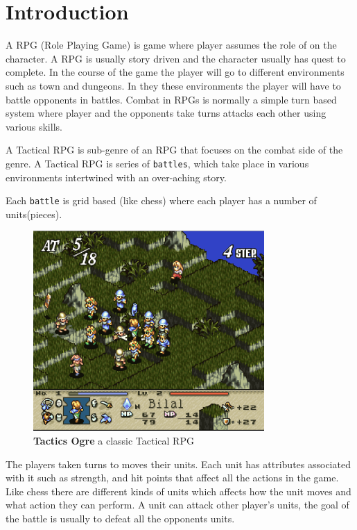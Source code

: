 %
%
%
 \maketitle


\section{Introduction} 
\label{introduction}
       
A RPG (Role Playing Game) is game where player assumes the role of on the character. A RPG is usually story driven and the character usually has quest to complete. In the course of the game the player will go to different environments such as town and dungeons. In they these environments the player will have to battle opponents in battles. Combat in RPGs is normally a simple turn based system where player and the opponents take turns attacks each other using various skills. 

A Tactical RPG is sub-genre of an RPG that focuses on the combat side of the genre. A Tactical RPG is series of \texttt{battles}, which take place in various environments intertwined with an over-aching story.

Each \texttt{battle} is grid based (like chess) where each player has a number of units(pieces). 
\begin{figure}
	[htbp] \centering 
	\includegraphics[height=3in]{figures/TRPG.png} \caption{\textbf{Tactics Ogre}\cite{to} a classic Tactical RPG } \label{fig:figures_TRPG} 
\end{figure}
The players taken turns to moves their units. Each unit has attributes associated with it such as strength, and hit points that affect all the actions in the game. Like chess there are different kinds of units which affects how the unit moves and what action they can perform. A unit can attack other player's units, the goal of the battle is usually to defeat all the opponents units.

